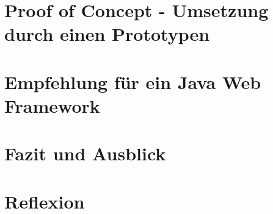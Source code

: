 \documentclass[
11pt, %
a4paper, %
BCOR25mm, %
DIV14, %
footsepline = false, %
headsepline, %
twoside, %
openright,
abstracton, %
listof=totocnumbered, %
bibliography=totocnumbered %
]{scrreprt}
\begin{document}
  

  \cleardoublepage
  
  
  \chapter{Proof of Concept - Umsetzung durch einen
  Prototypen}\label{chapter:ProofOfConcept}
  
  

  \cleardoublepage  
  
   
  \chapter{Empfehlung für ein Java Web
  Framework}\label{chapter:EmpfehlungFuerEinJavaWebFramework}
  
  

  \cleardoublepage
  
   
  \chapter{Fazit und Ausblick}\label{chapter:FazitUndAusblick}
  
  

  \cleardoublepage
  
  
  \chapter{Reflexion}\label{chapter:Reflexion}
  
\end{document}
